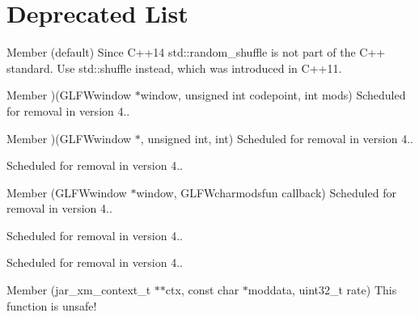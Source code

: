 \chapter{Deprecated List}
\hypertarget{deprecated}{}\label{deprecated}

\begin{DoxyRefList}
\item[Member \doxylink{group__sorting__algorithms_ga544d74b2d5d0dd2197f5fd6f02691de0}{\+\_\+\+GLIBCXX\+\_\+\+VISIBILITY} (default)]\label{deprecated__deprecated000003}%
%
 Since C++14 {\ttfamily std\+::random\+\_\+shuffle} is not part of the C++ standard. Use {\ttfamily std\+::shuffle} instead, which was introduced in C++11.  
\item[Member \doxylink{group__input_gac3cf64f90b6219c05ac7b7822d5a4b8f}{GLFWcharmodsfun} )(GLFWwindow \texorpdfstring{$\ast$}{*}window, unsigned int codepoint, int mods)]\label{deprecated__deprecated000001}%
%
Scheduled for removal in version 4.. 
\item[Member \doxylink{group__input_ga78c3d45fdf9aaef0b8d670bf2a9519e2}{GLFWcharmodsfun} )(GLFWwindow \texorpdfstring{$\ast$}{*}, unsigned int, int)]\label{deprecated__deprecated000009}%
%
Scheduled for removal in version 4..

\label{deprecated__deprecated000013}%
%
Scheduled for removal in version 4.. 
\item[Member \doxylink{group__input_ga359a8529c2eb06e6e2173168f30ac99c}{glfw\+Set\+Char\+Mods\+Callback} (GLFWwindow \texorpdfstring{$\ast$}{*}window, GLFWcharmodsfun callback)]\label{deprecated__deprecated000002}%
%
Scheduled for removal in version 4..

\label{deprecated__deprecated000010}%
%
Scheduled for removal in version 4..

\label{deprecated__deprecated000014}%
%
Scheduled for removal in version 4.. 
\item[Member \doxylink{raylib_2src_2external_2jar__xm_8h_a4f0bd4a385e83456056e3e07da9ac809}{jar\+\_\+xm\+\_\+create\+\_\+context} (jar\+\_\+xm\+\_\+context\+\_\+t \texorpdfstring{$\ast$}{*}\texorpdfstring{$\ast$}{*}ctx, const char \texorpdfstring{$\ast$}{*}moddata, uint32\+\_\+t rate)]\label{deprecated__deprecated000012}%
%
This function is unsafe! 


\end{DoxyRefList}
